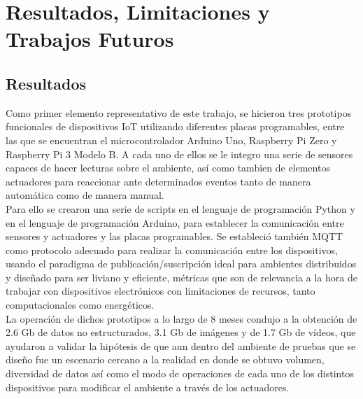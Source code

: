 

\chapter{Resultados, Limitaciones y Trabajos Futuros}

\section{Resultados}
Como primer elemento representativo de este trabajo, se hicieron tres prototipos funcionales de dispositivos IoT utilizando diferentes placas programables, entre las que se encuentran el microcontrolador Arduino Uno, Raspberry Pi Zero y Raspberry Pi 3 Modelo B. A cada uno de ellos se le integro una serie de sensores capaces de hacer lecturas sobre el ambiente, así como tambien de elementos actuadores para reaccionar ante determinados eventos tanto de manera automática como de manera manual.\\

Para ello se crearon una serie de scripts en el lenguaje de programación Python y en el lenguaje de programación Arduino, para establecer la comunicación entre sensores y actuadores y las placas programables.  Se estableció también MQTT como protocolo adecuado para realizar la comunicación entre los dispositivos, usando el paradigma de publicación/suscripción ideal para ambientes distribuidos y diseñado para ser liviano y eficiente, métricas que son de relevancia a la hora de trabajar con dispositivos electrónicos con limitaciones de recursos, tanto computacionales como energéticos.\\

La operación de dichos prototipos a lo largo de 8 meses condujo a la obtención de 2.6 Gb de datos no estructurados, 3.1 Gb de imágenes y de 1.7 Gb de vídeos, que ayudaron a validar la hipótesis de que aun dentro del ambiente de pruebas que se diseño fue un escenario cercano a la realidad en donde se obtuvo volumen, diversidad de datos así como el modo de operaciones de cada uno de los distintos dispositivos para modificar el ambiente a través de los actuadores.\\

